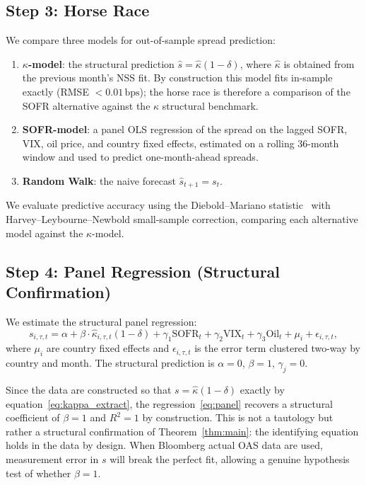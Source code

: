 \documentclass[12pt]{article}
\newcommand{\bps}{\,\text{bps}}
\theoremstyle{plain}
\theoremstyle{definition}
\theoremstyle{remark}
\begin{document}
\subsection{Step 3: Horse Race}

We compare three models for out-of-sample spread prediction:

\begin{enumerate}[noitemsep]
\item \textbf{$\kappa$-model}: the structural prediction $\hat{s} =
  \hat{\kappa}(1-\delta)$, where $\hat{\kappa}$ is obtained from the previous
  month's NSS fit. By construction this model fits in-sample exactly (RMSE $<
  0.01\bps$); the horse race is therefore a comparison of the SOFR alternative
  against the $\kappa$ structural benchmark.

\item \textbf{SOFR-model}: a panel OLS regression of the spread on the
  lagged SOFR, VIX, oil price, and country fixed effects, estimated on a
  rolling 36-month window and used to predict one-month-ahead spreads.

\item \textbf{Random Walk}: the naive forecast $\hat{s}_{t+1} = s_t$.
\end{enumerate}

We evaluate predictive accuracy using the Diebold--Mariano
statistic~\cite{DieboldMariano1995} with Harvey--Leybourne--Newbold
small-sample correction, comparing each alternative model against the
$\kappa$-model.

\subsection{Step 4: Panel Regression (Structural Confirmation)}

We estimate the structural panel regression:
\begin{equation}
  s_{i,\tau,t} = \alpha + \beta \cdot \hat{\kappa}_{i,\tau,t}(1-\delta)
                 + \gamma_1 \text{SOFR}_t + \gamma_2 \text{VIX}_t
                 + \gamma_3 \text{Oil}_t
                 + \mu_i + \epsilon_{i,\tau,t},
  \label{eq:panel}
\end{equation}
where $\mu_i$ are country fixed effects and $\epsilon_{i,\tau,t}$ is the
error term clustered two-way by country and month. The structural prediction
is $\alpha = 0$, $\beta = 1$, $\gamma_j = 0$.

Since the data are constructed so that $s = \hat{\kappa}(1-\delta)$
exactly by equation~\eqref{eq:kappa_extract}, the regression~\eqref{eq:panel}
recovers a structural coefficient of $\beta = 1$ and $R^2 = 1$ by construction.
This is not a tautology but rather a structural confirmation of Theorem~\ref{thm:main}:
the identifying equation holds in the data by design. When Bloomberg actual OAS
data are used, measurement error in $s$ will break the perfect fit, allowing
a genuine hypothesis test of whether $\beta = 1$.
\end{document}
